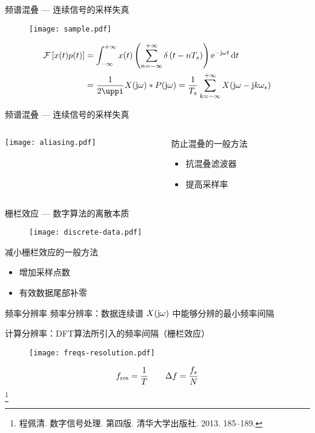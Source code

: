 \documentclass{beamer}
\begin{document}
\begin{frame}{频谱混叠 --- 连续信号的采样失真}
    \begin{figure}
        \centering
        \texttt{[image: sample.pdf]}
    \end{figure}
    \begin{align*}
        \mathcal{F}\left[x(t)p(t)\right] &= \int_{-\infty}^{+\infty} x(t) \left(\sum_{n=-\infty}^{+\infty} \delta \left(t-nT_s\right)\right) \e{-\j\omega t} \dif t \\
        &= \frac{1}{2\uppi} X(\j\omega) \ast P(\j\omega)
        = \frac{1}{T_s} \sum_{k=-\infty}^{+\infty} X(\j\omega - \j k \omega_s)
    \end{align*}
\end{frame}


\begin{frame}{频谱混叠 --- 连续信号的采样失真}
    \begin{columns}
        \begin{column}{0.53\textwidth}
            \centering
            \texttt{[image: aliasing.pdf]}
        \end{column}
        \begin{column}{0.4\textwidth}
            防止混叠的一般方法
            \begin{itemize}
                \item 抗混叠滤波器
                \item 提高采样率
            \end{itemize}
        \end{column}
    \end{columns}
\end{frame}


\begin{frame}{栅栏效应 --- 数字算法的离散本质}
    \begin{figure}
        \centering
        \texttt{[image: discrete-data.pdf]}
    \end{figure}
    减小栅栏效应的一般方法
    \begin{itemize}
        \item 增加采样点数
        \item 有效数据尾部补零
    \end{itemize}
\end{frame}


\begin{frame}{频率分辨率}
    频率分辨率：数据连续谱 $X(\mathrm{j}\omega)$ 中能够分辨的最小频率间隔

    计算分辨率：DFT算法所引入的频率间隔（栅栏效应）
    \begin{figure}
        \centering
        \texttt{[image: freqs-resolution.pdf]}
    \end{figure}
    \begin{align*}
        f_{\rm res} = \frac{1}{T} \qquad \Delta f = \frac{f_s}{N}
    \end{align*}
    \footnote{程佩清. 数字信号处理. 第四版. 清华大学出版社. 2013. 185--189.}
\end{frame}
\end{document}
